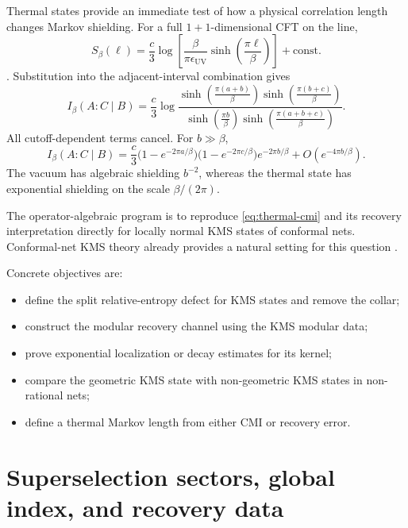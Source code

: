 \documentclass[11pt]{article}
\theoremstyle{accenttheorem}
\theoremstyle{definition}
\newcommand{\CMI}{I}
\newcommand{\1}{\mathbf{1}}
\begin{document}
Thermal states provide an immediate test of how a physical correlation length changes Markov shielding.  For a full \(1+1\)-dimensional CFT on the line,
\[
 S_\beta(\ell)
 =\frac{c}{3}
 \log\!\left[
 \frac{\beta}{\pi\epsilon_{\mathrm{UV}}}
 \sinh\!\left(\frac{\pi\ell}{\beta}\right)
 \right]+\mathrm{const.}
\]
\cite{CalabreseCardy}.  Substitution into the adjacent-interval combination gives
\begin{equation}\label{eq:thermal-cmi}
 \boxed{
 \CMI_\beta(A:C\mid B)
 =\frac{c}{3}
 \log
 \frac{
 \sinh\!\left(\frac{\pi(a+b)}{\beta}\right)
 \sinh\!\left(\frac{\pi(b+c)}{\beta}\right)
 }{
 \sinh\!\left(\frac{\pi b}{\beta}\right)
 \sinh\!\left(\frac{\pi(a+b+c)}{\beta}\right)
 }.
 }
\end{equation}
All cutoff-dependent terms cancel.  For \(b\gg\beta\),
\begin{equation}\label{eq:thermal-asymp}
 \CMI_\beta(A:C\mid B)
 =\frac{c}{3}
 \bigl(1-e^{-2\pi a/\beta}\bigr)
 \bigl(1-e^{-2\pi c/\beta}\bigr)
 e^{-2\pi b/\beta}
 +O(e^{-4\pi b/\beta}).
\end{equation}
The vacuum has algebraic shielding \(b^{-2}\), whereas the thermal state has exponential shielding on the scale \(\beta/(2\pi)\).

The operator-algebraic program is to reproduce \eqref{eq:thermal-cmi} and its recovery interpretation directly for locally normal KMS states of conformal nets.  Conformal-net KMS theory already provides a natural setting for this question \cite{CamassaEtAl}.

Concrete objectives are:
\begin{itemize}
\item define the split relative-entropy defect for KMS states and remove the collar;
\item construct the modular recovery channel using the KMS modular data;
\item prove exponential localization or decay estimates for its kernel;
\item compare the geometric KMS state with non-geometric KMS states in non-rational nets;
\item define a thermal Markov length from either CMI or recovery error.
\end{itemize}

\section{Superselection sectors, global index, and recovery data}
\end{document}
